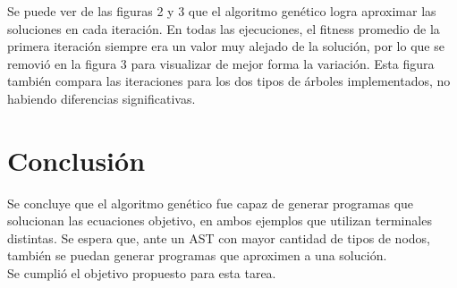 \documentclass[11pt,letterpaper]{article}
\begin{document}
Se puede ver de las figuras 2 y 3 que el algoritmo genético logra aproximar las soluciones en cada 
iteración. En todas las ejecuciones, el fitness promedio de la primera iteración siempre era un valor 
muy alejado de la solución, por lo que se removió en la figura 3 para visualizar de mejor forma la 
variación. Esta figura también compara las iteraciones para los dos tipos de árboles implementados, 
no habiendo diferencias significativas.

\section{Conclusión}
Se concluye que el algoritmo genético fue capaz de generar programas que solucionan las ecuaciones 
objetivo, en ambos ejemplos que utilizan terminales distintas. Se espera que, ante un AST con mayor 
cantidad de tipos de nodos, también se puedan generar programas que aproximen a una solución.\\

Se cumplió el objetivo propuesto para esta tarea.

\end{document}
